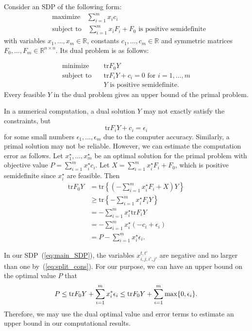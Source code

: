 \documentclass[final,onecolumn]{IEEEtran}
\theoremstyle{definition}
\begin{document}
Consider an SDP of the following form:
\begin{align*}
	&\text{maximize} \quad \sum_{i=1}^{m}x_{i}c_{i}\\
	&\text{subject to} \quad \sum_{i=1}^{m}x_{i}F_{i} + F_{0}  \text{ is positive semidefinite}
\end{align*}
with variables $x_{1}, \dots, x_{m}\in\mathbb{R}$, constants $c_{1}, \dots, c_{m}\in\mathbb{R}$ and symmetric matrices $F_{0}, \dots, F_{m}\in\mathbb{R}^{n\times n}$. Its dual problem is as follows: 

\begin{align*}
	\text{minimize} \quad & \text{tr}{F_{0} Y} \\
	\text{subject to} \quad &\text{tr}{F_{i}Y} + c_{i}=0  \text{ for } i=1,\dots, m\\
	& Y \text{ is positive semidefinite.}
\end{align*}
Every feasible $Y$ in the dual problem gives an upper bound of the primal problem. 
	
In a numerical computation, a dual solution $Y$ may not exactly satisfy the constraints, but 
\begin{equation*}
	\text{tr} F_{i} Y + c_{i} = \epsilon_{i}
\end{equation*}
for some small numbers $\epsilon_{1}, \dots, \epsilon_{m}$ due to the computer accuracy. Similarly, a primal solution may not be reliable.
However, we can estimate the computation error as follows. Let $x_{1}^\star, \dots, x_{m}^\star$ be an optimal solution for the primal problem with objective value $P = \sum_{i = 1}^{m}x_{i}^\star c_{i}$. Let $X=\sum_{i=1}^{m}x_{i}^\star F_{i} + F_{0}$, which is positive semidefinite since $x_i^\star$ are feasible. Then
\begin{align*}
	\text{tr} F_{0} Y  &= \text{tr}  \left\{\left(-\sum_{i = 1}^{m} x_{i}^\star F_{i} +X\right) Y \right\}\\
	& \geq \text{tr}  \left\{-\sum_{i = 1}^{m} x_{i}^\star F_{i} Y \right\}\\
	&= -\sum_{i=1}^{m} x_{i}^\star \text{tr}  F_{i} Y  \\
	&= -\sum_{i = 1}^{m} x_{i}^\star(-c_{i}+ \epsilon_{i})\\
	&= P - \sum_{i = 1}^{m} x_{i}^\star\epsilon_{i}.
\end{align*}

In our SDP~(\ref{eq:main_SDP}), the variables $x_{i,j,i',j'}^{t,t'}$ are negative and no larger than one by~(\ref{eq:split_cons}).
For our purpose, we can have an upper bound on the optimal value $P$ that
\begin{equation*}
	P \leq	\text{tr} F_{0} Y + \sum_{i = 1}^{m}x_{i}^{*}\epsilon_{i} \leq  \text{tr} F_{0} Y + \sum_{i=1}^{m}{\rm max}\{0,\epsilon_{i}\}.
\end{equation*}
Therefore, we may use the dual optimal value and error terms to estimate an upper bound in our computational results. 
\end{document}
